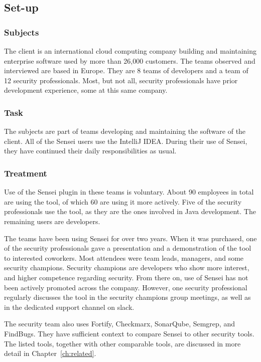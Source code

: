 \subsection{Set-up}

\subsubsection{Subjects}
The client is an international cloud computing company building and maintaining enterprise software used by more than 26,000 customers.
The teams observed and interviewed are based in Europe.
They are 8 teams of developers and a team of 12 security professionals.
Most, but not all, security professionals have prior development experience, some at this same company.

\subsubsection{Task}
The subjects are part of teams developing and maintaining the software of the client.
All of the Sensei users use the IntelliJ IDEA.
During their use of Sensei, they have continued their daily responsibilities as usual.

\subsubsection{Treatment}
Use of the Sensei plugin in these teams is voluntary.
About 90 employees in total are using the tool, of which 60 are using it more actively.
Five of the security professionals use the tool, as they are the ones involved in Java development.
The remaining users are developers.

The teams have been using Sensei for over two years.
When it was purchased, one of the security professionals gave a presentation and a demonstration of the tool to interested coworkers.
Most attendees were team leads, managers, and some security champions.
Security champions are developers who show more interest, and higher competence regarding security.
From there on, use of Sensei has not been actively promoted across the company.
However, one security professional regularly discusses the tool in the security champions group meetings, as well as in the dedicated support channel on \gls{slack}.

The security team also uses Fortify, Checkmarx, SonarQube, Semgrep, and FindBugs.
They have sufficient context to compare Sensei to other security tools.
The listed tools, together with other comparable tools, are discussed in more detail in Chapter~\ref{ch:related}.

